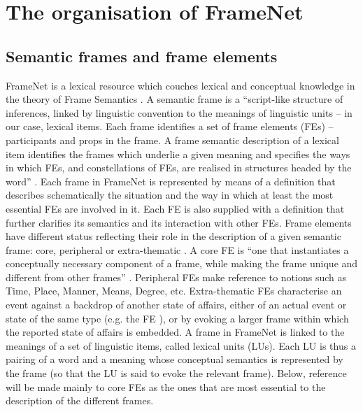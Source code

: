 \documentclass[output=paper,colorlinks,citecolor=brown]{langscibook}
\begin{document}
\section{The organisation of FrameNet}

\subsection{Semantic frames and frame elements}

FrameNet \citep{Baker1998,Baker2008} is a lexical resource which couches lexical and conceptual knowledge in %
the theory of Frame Semantics \citep{Johnson2001,Fillmore2003:ch4,Ruppenhofer2016}. A semantic frame is a ``script-like structure of inferences, linked by linguistic convention to the meanings of linguistic units -- in our case, lexical items. Each frame identifies a set of frame elements (FEs) -- participants and props in the frame. A frame semantic description of a lexical item identifies the frames which underlie a given meaning and specifies the ways in which FEs, and constellations of FEs, are realised in structures headed by the word” \citep[9]{Johnson2001}. Each frame in FrameNet is represented by means of a definition that describes schematically the situation and the way in which at least the most essential FEs are involved in it. Each FE is also supplied with a definition that further clarifies its semantics and its interaction with other FEs. Frame elements have different status reflecting their role in the description of a given semantic frame: core, peripheral or extra-thematic \citep[19--20]{Ruppenhofer2016}. A core FE is ``one that instantiates a conceptually necessary component of a frame, while making the frame unique and different from other frames” \citep[23]{Ruppenhofer2016}. Peripheral FEs make reference to notions such as Time, Place, Manner, Means, Degree, etc. Extra-thematic FEs characterise an event against a backdrop of another state of affairs, either of an actual event or state of the same type (e.g. the FE ), or by evoking a larger frame within which the reported state of affairs is embedded. A frame in FrameNet is linked to the meanings of a set of linguistic items, called lexical units (LUs). Each LU is thus a pairing of a word and a meaning whose conceptual semantics is represented by the frame (so that the LU is said to evoke the relevant frame). Below, reference will be made mainly to core FEs as the ones that are most essential to the description of the different frames.
\end{document}

